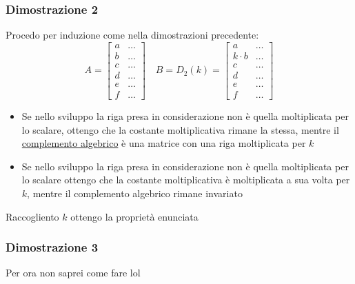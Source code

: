 \documentclass[12pt,a4paper,oneside]{article}
\begin{document}
\subsubsection*{Dimostrazione 2}
Procedo per induzione come nella dimostrazioni precedente:
\[
	A=
	\begin{bmatrix}
		a & \ldots \\b& \ldots\\c& \ldots  \\d& \ldots\\e& \ldots\\f & \ldots
	\end{bmatrix}
	\quad
	B= D_2\left( k \right) =
	\begin{bmatrix}
		a & \ldots \\k\cdot b& \ldots\\c& \ldots  \\d& \ldots\\e& \ldots\\f & \ldots
	\end{bmatrix}
\]
\begin{itemize}
	\item Se nello sviluppo la riga presa in considerazione non è quella moltiplicata per lo scalare, ottengo che la costante moltiplicativa rimane la stessa, mentre il \underline{complemento algebrico} è una matrice con una riga moltiplicata per $ k $
	\item Se nello sviluppo la riga presa in considerazione non è quella moltiplicata per lo scalare ottengo che la costante moltiplicativa è moltiplicata a sua volta per $ k $, mentre il complemento algebrico rimane invariato
\end{itemize}
Raccogliento $ k $ ottengo la proprietà enunciata
\subsubsection*{Dimostrazione 3}
Per ora non saprei come fare lol
\end{document}

